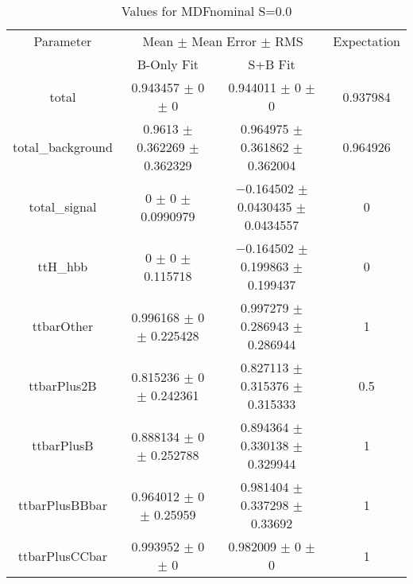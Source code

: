 \begin{table}
\centering
\caption{Values for MDFnominal S=0.0}
\begin{tabular}{cccc}
\toprule
Parameter & \multicolumn{2}{c}{Mean $\pm$ Mean Error $\pm$ RMS} & Expectation\\
 & B-Only Fit & S+B Fit & \\
\midrule
total & \num{0.943457} $\pm$ \num{0} $\pm$ \num{0} & \num{0.944011} $\pm$ \num{0} $\pm$ \num{0} & \num{0.937984}\\
total\_background & \num{0.9613} $\pm$ \num{0.362269} $\pm$ \num{0.362329} & \num{0.964975} $\pm$ \num{0.361862} $\pm$ \num{0.362004} & \num{0.964926}\\
total\_signal & \num{0} $\pm$ \num{0} $\pm$ \num{0.0990979} & \num{-0.164502} $\pm$ \num{0.0430435} $\pm$ \num{0.0434557} & \num{0}\\
ttH\_hbb & \num{0} $\pm$ \num{0} $\pm$ \num{0.115718} & \num{-0.164502} $\pm$ \num{0.199863} $\pm$ \num{0.199437} & \num{0}\\
ttbarOther & \num{0.996168} $\pm$ \num{0} $\pm$ \num{0.225428} & \num{0.997279} $\pm$ \num{0.286943} $\pm$ \num{0.286944} & \num{1}\\
ttbarPlus2B & \num{0.815236} $\pm$ \num{0} $\pm$ \num{0.242361} & \num{0.827113} $\pm$ \num{0.315376} $\pm$ \num{0.315333} & \num{0.5}\\
ttbarPlusB & \num{0.888134} $\pm$ \num{0} $\pm$ \num{0.252788} & \num{0.894364} $\pm$ \num{0.330138} $\pm$ \num{0.329944} & \num{1}\\
ttbarPlusBBbar & \num{0.964012} $\pm$ \num{0} $\pm$ \num{0.25959} & \num{0.981404} $\pm$ \num{0.337298} $\pm$ \num{0.33692} & \num{1}\\
ttbarPlusCCbar & \num{0.993952} $\pm$ \num{0} $\pm$ \num{0} & \num{0.982009} $\pm$ \num{0} $\pm$ \num{0} & \num{1}\\
\bottomrule
\end{tabular}
\end{table}